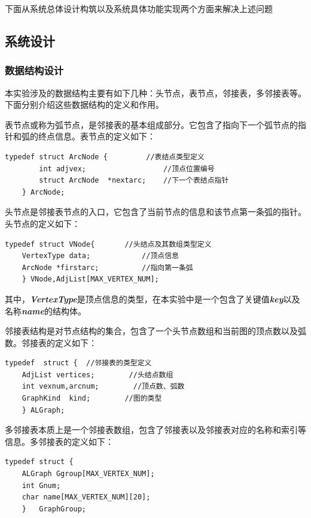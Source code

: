 \documentclass[supercite]{Experimental_Report}
\theoremstyle{definition}
\begin{document}
下面从系统总体设计构筑以及系统具体功能实现两个方面来解决上述问题

\subsection{系统设计}

\subsubsection{数据结构设计}
	本实验涉及的数据结构主要有如下几种：头节点，表节点，邻接表，多邻接表等。下面分别介绍这些数据结构的定义和作用。

	表节点或称为弧节点，是邻接表的基本组成部分。它包含了指向下一个弧节点的指针和弧的终点信息。表节点的定义如下：
	\begin{lstlisting}[caption={表节点定义}, label=lst:arc_node]
	typedef struct ArcNode {         //表结点类型定义
		int adjvex;                  //顶点位置编号 
		struct ArcNode  *nextarc;	 //下一个表结点指针
	} ArcNode;
	\end{lstlisting}

	头节点是邻接表节点的入口，它包含了当前节点的信息和该节点第一条弧的指针。头节点的定义如下：
	\begin{lstlisting}[caption={头节点定义}, label=lst:head_node]
	typedef struct VNode{		//头结点及其数组类型定义
   	VertexType data;       		//顶点信息
    ArcNode *firstarc;      	//指向第一条弧
    } VNode,AdjList[MAX_VERTEX_NUM];
	\end{lstlisting}
	其中，\textbf{\textit{VertexType}}是顶点信息的类型，在本实验中是一个包含了关键值\textbf{\textit{key}}以及名称\textbf{\textit{name}}的结构体。

	邻接表结构是对节点结构的集合，包含了一个头节点数组和当前图的顶点数以及弧数。邻接表的定义如下：
	\begin{lstlisting}[caption={邻接表定义}, label=lst:adjacency_list]
	typedef  struct {  //邻接表的类型定义
	AdjList vertices;     	 //头结点数组
	int vexnum,arcnum;   	  //顶点数、弧数
	GraphKind  kind;        //图的类型
	} ALGraph;
	\end{lstlisting}

	多邻接表本质上是一个邻接表数组，包含了邻接表以及邻接表对应的名称和索引等信息。多邻接表的定义如下：
	\begin{lstlisting}[caption={多邻接表定义}, label=lst:multi_adjacency_list]
	typedef struct {
	ALGraph Ggroup[MAX_VERTEX_NUM];
	int Gnum;
	char name[MAX_VERTEX_NUM][20];
	}	GraphGroup;
	\end{lstlisting}
\end{document}
